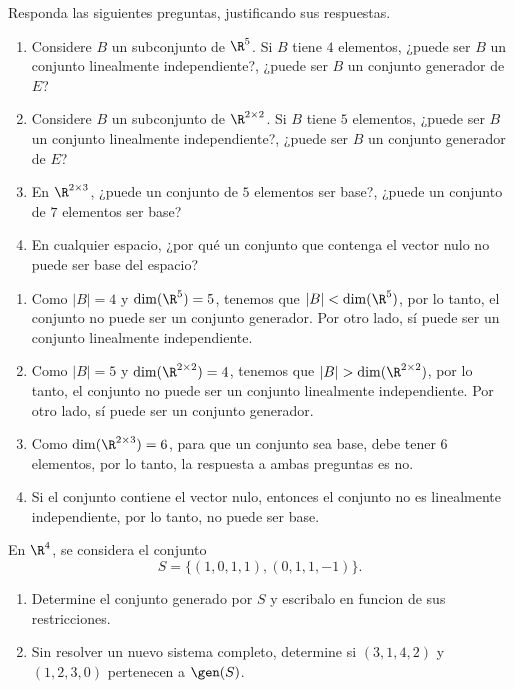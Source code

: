 \documentclass[11pt,respuestas,a4]{aleph-examen}
\begin{document}
\begin{preguntas}

\item
    Responda las siguientes preguntas, justificando sus respuestas.
    \begin{enumerate}[leftmargin=*]
    \item 
        Considere $B$ un subconjunto de $\R^{5}$. Si $B$ tiene $4$ elementos, ¿puede ser $B$ un conjunto linealmente independiente?, ¿puede ser $B$ un conjunto generador de $E$?
    \item 
        Considere $B$ un subconjunto de $\R^{2\times 2}$. Si $B$ tiene $5$ elementos, ¿puede ser $B$ un conjunto linealmente independiente?, ¿puede ser $B$ un conjunto generador de $E$?
    \item 
        En $\R^{2\times 3}$, ¿puede un conjunto de $5$ elementos ser base?, ¿puede un conjunto de $7$ elementos ser base?
    \item 
        En cualquier espacio, ¿por qué un conjunto que contenga el vector nulo no puede ser base del espacio?
    \end{enumerate}

\begin{respuesta}[Respuesta]\hspace{0pt}
    \begin{enumerate}
    \item 
        Como $|B|=4$ y $\dim(\R^{5}) = 5$, tenemos que $|B| < \dim(\R^{5})$, por lo tanto, el conjunto no puede ser un conjunto generador. Por otro lado, sí puede ser un conjunto linealmente independiente. 
    \item 
        Como $|B|=5$ y $\dim(\R^{2\times 2}) = 4$, tenemos que $|B| > \dim(\R^{2\times 2})$, por lo tanto, el conjunto no puede ser un conjunto linealmente independiente. Por otro lado, sí puede ser un conjunto generador.
    \item
        Como $\dim(\R^{2\times 3}) = 6$, para que un conjunto sea base, debe tener $6$ elementos, por lo tanto, la respuesta a ambas preguntas es no.
    \item 
        Si el conjunto contiene el vector nulo, entonces el conjunto no es linealmente independiente, por lo tanto, no puede ser base. \qedhere
    \end{enumerate}
\end{respuesta}

\item
    En $\R^4$, se considera el conjunto
    \[
        S=\big\{
            (1,0,1,1),
            (0,1,1,-1)
        \big\}.
    \]
    \begin{enumerate}
    \item
        Determine el conjunto generado por $S$ y escribalo en funcion de sus restricciones.
    \item
        Sin resolver un nuevo sistema completo, determine si $(3,1,4,2)$ y $(1,2,3,0)$ pertenecen a $\gen(S)$.
    \end{enumerate}


\end{preguntas}
\end{document}

